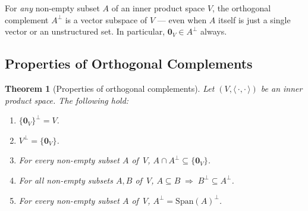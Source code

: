 \documentclass[11pt, a4paper, notitlepage]{report}
\newtheorem{theorem}{Theorem}[section]
\theoremstyle{definition}
\theoremstyle{remark}
\begin{document}
\begin{keyresult}[title={Key Result: $A^\perp$ is Always a Subspace}]
For \emph{any} non-empty subset $A$ of an inner product space $V$, the orthogonal
complement $A^\perp$ is a vector subspace of $V$ --- even when $A$ itself is just
a single vector or an unstructured set. In particular, $\mathbf{0}_V\in A^\perp$ always.
\end{keyresult}

\subsection{Properties of Orthogonal Complements}
\label{subsec:orth-comp-properties}

\begin{theorem}[Properties of orthogonal complements]
\label{thm:orth-comp-properties}
Let $(V,\langle\,\cdot,\cdot\,\rangle)$ be an inner product space.
The following hold:
\begin{enumerate}
  \item $\{\mathbf{0}_V\}^\perp = V$.
  \item $V^\perp = \{\mathbf{0}_V\}$.
  \item For every non-empty subset $A$ of~$V$,
        $A\cap A^\perp \subseteq \{\mathbf{0}_V\}$.
  \item For all non-empty subsets $A, B$ of~$V$,
        $A\subseteq B \;\Longrightarrow\; B^\perp\subseteq A^\perp$.
  \item For every non-empty subset $A$ of~$V$,
        $A^\perp = \mathrm{Span}(A)^\perp$.
\end{enumerate}
\end{theorem}
\end{document}

